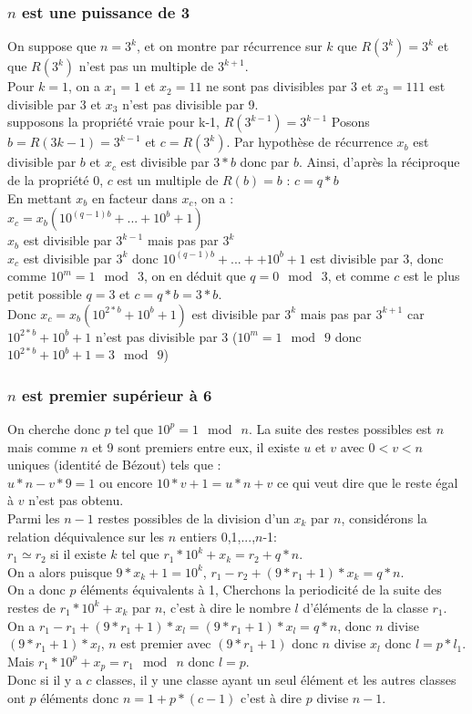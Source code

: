 \documentclass[a4paper,11pt]{book}
\begin{document}
\subsubsection{$n$ est une puissance de 3}
On suppose que $n=3^k$, et on  montre par r\'ecurrence sur $k$ que 
$R(3^k)=3^k$ et que $R(3^k)$ n'est pas un multiple de $3^{k+1}$.\\
Pour $k=1$, on a $x_1=1$ et $x_2=11$ ne sont pas divisibles par 3 et $x_3=111$
 est divisible par 3 et $x_3$ n'est pas divisible par 9.\\
supposons la propri\'et\'e vraie pour k-1, $R(3^{k-1})=3^{k-1}$
Posons $b=R(3{k-1})=3^{k-1}$ et $c=R(3^k)$.
Par hypoth\`ese de r\'ecurrence $x_b$ est divisible par $b$ et
$x_c$ est divisible par $3*b$ donc par $b$. Ainsi,
d'apr\`es la r\'eciproque de la propri\'et\'e 0,  $c$ est un multiple de 
$R(b)=b$ : $c=q*b$\\
En mettant $x_b$ en facteur dans $x_c$, on a :\\ 
$x_c=x_b(10^{(q-1)b}+...+10^b+1)$\\
$x_b$ est divisible par $3^{k-1}$ mais pas par $3^k$\\
$x_c$ est divisible par $3^k$ donc $10^{(q-1)b}+...++10^b+1$ est divisible par 
3, donc comme $10^m=1 \ \bmod \ 3$, on en d\'eduit que $q=0 \ \bmod \ 3$,
et comme $c$ est le plus petit possible $q=3$ et $c=q*b=3*b$.\\
Donc $x_c=x_b(10^{2*b}+10^b+1)$ est divisible par $3^k$ mais pas par $3^{k+1}$
car $10^{2*b}+10^b+1$ n'est pas divisible par 3 ($10^m=1 \ \bmod \ 9$ donc
$10^{2*b}+10^b+1=3 \ \bmod \ 9$)\\ 
\subsubsection{$n$ est premier sup\'erieur \`a 6}
On cherche donc $p$ tel que $10^p=1\ \bmod\ n$.
La suite des restes possibles est $n$ mais comme $n$ et 9 sont premiers entre 
eux, il existe $u$ et $v$ avec $0<v<n$ uniques (identit\'e de B\'ezout)
tels que :\\
$u*n-v*9=1$ ou encore $10*v+1=u*n+v$ ce qui veut dire que le reste \'egal \`a 
$v$ n'est pas obtenu.\\
Parmi les $n-1$ restes possibles  de la division d'un $x_k$ par $n$,
 consid\'erons la relation d\'equivalence sur les $n$ entiers 0,1,...,$n$-1:\\
$r_1 \simeq r_2$ si il existe $k$ tel que $r_1*10^k +x_k=r_2+q*n$.\\
On a alors puisque $9*x_k+1=10^k$, $r_1-r_2+(9*r_1+1)*x_k=q*n$.\\
On a donc $p$ \'el\'ements \'equivalents \`a 1,
Cherchons la periodicit\'e de la suite des restes de $r_1*10^k +x_k$ par $n$, 
c'est \`a dire le nombre $l$ d'\'el\'ements de la classe $r_1$.
On a $r_1-r_1+(9*r_1+1)*x_l=(9*r_1+1)*x_l=q*n$, donc $n$ divise 
$(9*r_1+1)*x_l$, $n$ est premier avec $(9*r_1+1)$ donc $n$ divise $x_l$
donc $l=p*l_1$.\\
Mais $r_1*10^p+x_p=r_1\  \bmod\  n$ donc $l=p$.\\
Donc si il y a $c$ classes, il y une classe ayant un seul \'el\'ement et les 
autres classes ont $p$ \'el\'ements donc $n=1+p*(c-1)$ c'est \`a dire $p$ 
divise $n-1$.
\end{document}
